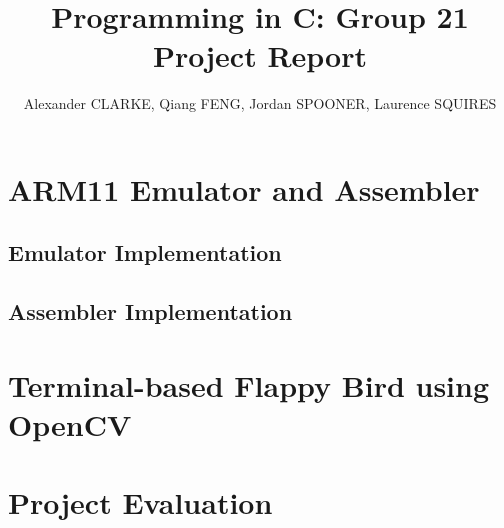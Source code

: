 \documentclass[10pt]{article}
\begin{document}
\title{\vspace{-2cm}Programming in C: Group 21 Project Report}
\author{\small Alexander CLARKE, Qiang FENG, Jordan SPOONER, Laurence SQUIRES}

\maketitle

\section{ARM11 Emulator and Assembler}

\subsection{Emulator Implementation}

\subsection{Assembler Implementation}

\section{Terminal-based Flappy Bird using OpenCV}

\section{Project Evaluation}
\end{document}
